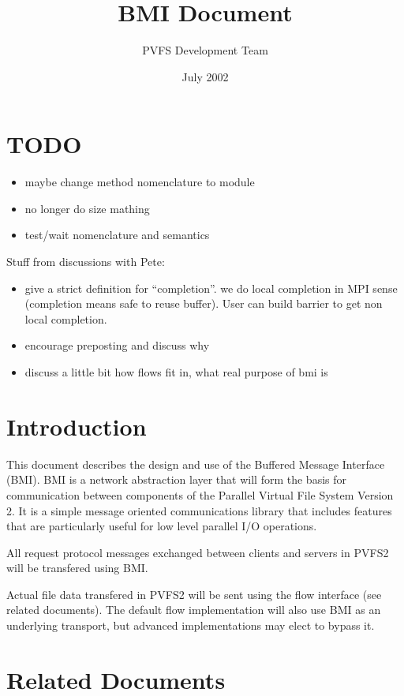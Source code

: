 \documentclass[11pt]{article}
\title{BMI Document}
\author{PVFS Development Team}
\date{July 2002}
\begin{document}
\maketitle

\section{TODO}

\begin{itemize}
\item maybe change method nomenclature to module
\item no longer do size mathing
\item test/wait nomenclature and semantics
\end{itemize}

Stuff from discussions with Pete:

\begin{itemize}
\item give a strict definition for ``completion''.  we do local
completion in MPI sense (completion means safe to reuse buffer).
User can build barrier to get non local completion.
\item encourage preposting and discuss why
\item discuss a little bit how flows fit in, what real purpose of
bmi is
\end{itemize}

\section{Introduction}

This document describes the design and use of the Buffered Message
Interface (BMI).  BMI is a network abstraction layer that will form the
basis for communication between components of the Parallel Virtual File
System Version 2.  It is a simple message oriented communications
library that includes features that are particularly useful for
low level parallel I/O operations.

All request protocol messages exchanged between clients and
servers in PVFS2 will be transfered using BMI.

Actual file data transfered in PVFS2 will be sent using the flow
interface (see related documents).  The default flow
implementation will also use BMI as an underlying transport, but
advanced implementations may elect to bypass it.

\section{Related Documents}
\end{document}

